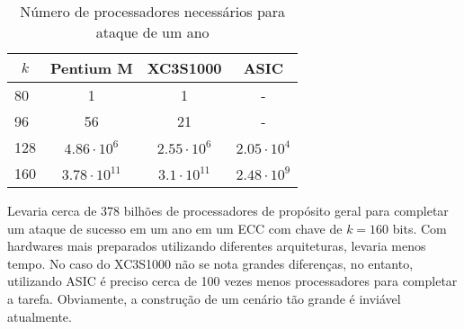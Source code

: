 \begin{table}[]
\centering
\label{table:required_chips}
\begin{tabular}{|l|c|c|c|}
\hline
\multicolumn{1}{|c|}{\(k\)} & \textbf{Pentium M}   & \textbf{XC3S1000}   & \textbf{ASIC}     \\ \hline
80                      & 1                    & 1                   & -                 \\ \hline
96                      & 56                   & 21                  & -                 \\ \hline
128                     & $4.86 \cdot 10^6$    & $2.55 \cdot 10^6$   & $2.05 \cdot 10^4$ \\ \hline
160                     & $3.78 \cdot 10^{11}$ & $3.1 \cdot 10^{11}$ & $2.48 \cdot 10^9$ \\ \hline
\end{tabular}
\caption{Número de processadores necessários para ataque de um ano}
\end{table}

Levaria cerca de 378 bilhões de processadores de propósito geral para completar um ataque de sucesso em um ano em um ECC com chave de $k = 160$ bits. Com hardwares mais preparados utilizando diferentes arquiteturas, levaria menos tempo. No caso do XC3S1000 não se nota grandes diferenças, no entanto, utilizando ASIC é preciso cerca de 100 vezes menos processadores para completar a tarefa. Obviamente, a construção de um cenário tão grande é inviável atualmente.

